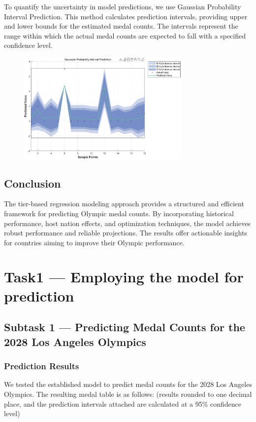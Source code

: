 \documentclass{mcmthesis}
\begin{document}
To quantify the uncertainty in model predictions, we use Gaussian Probability Interval Prediction. This method calculates prediction intervals, providing upper and lower bounds for the estimated medal counts. The intervals represent the range within which the actual medal counts are expected to fall with a specified confidence level.
\begin{figure}[htbp]
    \centering
    \includegraphics[width=3.33in, keepaspectratio]{pics/Gaussian Probability Interval Prediction.eps}  
\end{figure}

\subsection{Conclusion}

The tier-based regression modeling approach provides a structured and efficient framework for predicting Olympic medal counts. By incorporating historical performance, host nation effects, and optimization techniques, the model achieves robust performance and reliable projections. The results offer actionable insights for countries aiming to improve their Olympic performance.

\section{Task1 --- Employing the model for prediction}

\subsection{Subtask 1 --- Predicting Medal Counts for the 2028 Los Angeles Olympics}

\subsubsection{Prediction Results}
We tested the established model to predict medal counts for the 2028 Los Angeles Olympics. The resulting medal table is as follows: (results rounded to one decimal place, and the prediction intervals attached are calculated at a 95\% confidence level)
\end{document}
